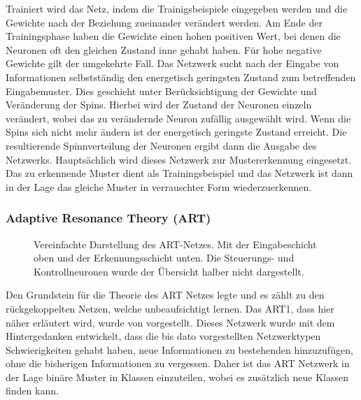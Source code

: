 Trainiert wird das Netz, indem die Trainigsbeispiele eingegeben werden und die Gewichte nach der Beziehung zueinander verändert werden. Am Ende der Trainingsphase haben die Gewichte einen hohen positiven Wert, bei denen die Neuronen oft den gleichen Zustand inne gehabt haben. Für hohe negative Gewichte gilt der umgekehrte Fall. Das Netzwerk sucht nach der Eingabe von Informationen selbstständig den energetisch geringsten Zustand zum betreffenden Eingabemuster. Dies geschieht unter Berücksichtigung der Gewichte und Veränderung der Spins. Hierbei wird der Zustand der Neuronen einzeln verändert, wobei das zu verändernde Neuron zufällig ausgewählt wird. Wenn die Spins sich nicht mehr ändern ist der energetisch geringste Zustand erreicht. Die resultierende Spinnverteilung der Neuronen ergibt dann die Ausgabe des Netzwerks. Hauptsächlich wird dieses Netzwerk zur Mustererkennung eingesetzt. Das zu erkennende Muster dient als Trainingsbeispiel und das Netzwerk ist dann in der Lage das gleiche Muster in verrauschter Form wiederzuerkennen.


\subsubsection{Adaptive Resonance Theory (ART)}%
\begin{figure}[!htb]
    \centering
        
    \caption{Vereinfachte Darstellung des ART-Netzes. Mit der Eingabeschicht oben und der Erkennungsschicht unten. Die Steuerungs- und Kontrollneuronen wurde der Übersicht halber nicht dargestellt.\,\protect\footnotemark{}}
    \label{fig:ART}
\end{figure}
\addtocounter{footnote}{-1}     %
\addtocounter{Hfootnote}{-1}    %
\wrapfigfoot{}
Den Grundstein für die Theorie des ART Netzes legte \citet{Grossberg1973} und es zählt zu den rückgekoppelten Netzen, welche unbeaufsichtigt lernen. Das ART1, dass hier näher erläutert wird, wurde von \citet{Carpenter1987} vorgestellt. Dieses Netzwerk wurde mit dem Hintergedanken entwickelt, dass die bis dato vorgestellten Netzwerktypen Schwierigkeiten gehabt haben, neue Informationen zu bestehenden hinzuzufügen, ohne die bisherigen Informationen zu \glqq vergessen\grqq . Daher ist das ART Netzwerk in der Lage binäre Muster in Klassen einzuteilen, wobei es zusätzlich neue Klassen finden kann. 

